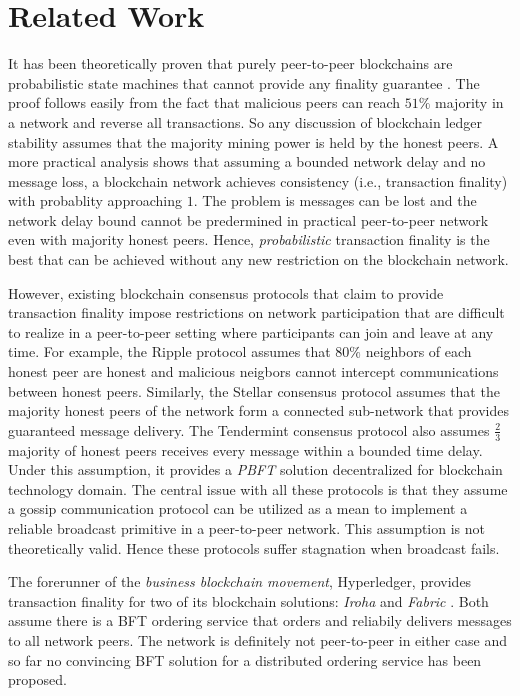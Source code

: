 \section{Related Work}
\label{s-related-work}
It has been theoretically proven that purely peer-to-peer blockchains are probabilistic state machines that cannot provide any finality guarantee \cite{7756226}. The proof follows easily from the fact that malicious peers can reach $51\%$ majority in a network and reverse all transactions. So any discussion of blockchain ledger stability assumes that the majority mining power is held by the honest peers. A more practical analysis \cite{10.1007/978-3-319-56614-6_22} shows that assuming a bounded network delay and no message loss, a blockchain network achieves consistency (i.e., transaction finality) with probablity approaching $1$. The problem is messages can be lost and the network delay bound cannot be predermined in practical peer-to-peer network even with majority honest peers. Hence, \textit{probabilistic} transaction finality is the best that can be achieved without any new restriction on the blockchain network.

However, existing blockchain consensus protocols that claim to provide transaction finality impose restrictions on network participation that are difficult to realize in a peer-to-peer setting where participants can join and leave at any time. For example, the Ripple \cite{David2014TheRP} protocol assumes that $80\%$ neighbors of each honest peer are honest and malicious neigbors cannot intercept communications between honest peers. Similarly, the Stellar consensus protocol \cite{thestellar} assumes that the majority honest peers of the network form a connected sub-network that provides guaranteed message delivery. The Tendermint consensus protocol \cite{Buchman2018TheLG} also assumes $\frac{2}{3}$ majority of honest peers receives every message within a bounded time delay. Under this assumption, it provides a \textit{PBFT} \cite{Castro:1999:PBF:296806.296824} solution decentralized for blockchain technology domain. The central issue with all these protocols is that they assume a gossip communication protocol \cite{gossip} can be utilized as a mean to implement a reliable broadcast primitive \cite{Jalote:1994:FTD:179250} in a peer-to-peer network. This assumption is not theoretically valid. Hence these protocols suffer stagnation when broadcast fails.          

The forerunner of the \textit{business blockchain movement}, Hyperledger, provides transaction finality for two of its blockchain solutions: \textit{Iroha} \cite{yac} and \textit{Fabric} \cite{patent:20180150799}. Both assume there is a BFT ordering service that orders and reliabily delivers messages to all network peers. The network is definitely not peer-to-peer in either case and so far no convincing BFT solution for a distributed ordering service has been proposed. 

